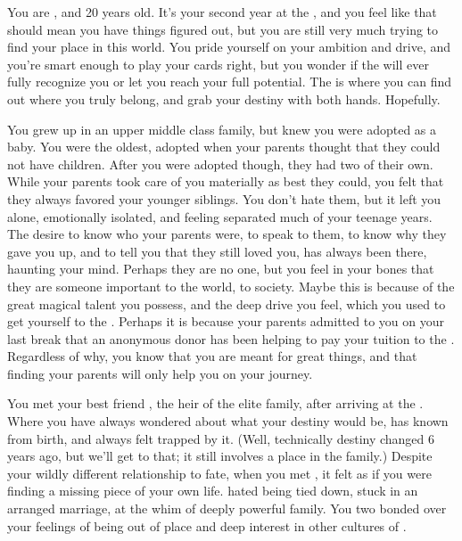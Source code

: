\documentclass[char]{GL2020}
\begin{document}
\name{\cAmbition{}}

You are \cAmbition{\intro}, and 20 years old. It's your second year at the \pSchool{}, and you feel like that should mean you have things figured out, but you are still very much trying to find your place in this world. You pride yourself on your ambition and drive, and you're smart enough to play your cards right, but you wonder if the \pTechies{} will ever fully recognize you or let you reach your full potential. The \pSchool{} is where you can find out where you truly belong, and grab your destiny with both hands. Hopefully. 

You grew up in an upper middle class family,  but knew you were adopted as a baby. You were the oldest, adopted when your parents thought that they could not have children. After you were adopted though, they had two of their own. While your parents took care of you materially as best they could, you felt that they always favored your younger siblings. You don’t hate them, but it left you alone, emotionally isolated, and feeling separated much of your teenage years. The desire to know who your parents were, to speak to them, to know why they gave you up,  and to tell you that they still loved you, has always been there, haunting your mind. Perhaps they are no one, but you feel in your bones that they are someone important to the world, to society. Maybe this is because of the great magical talent you possess, and the deep drive you feel, which you used to get yourself to the \pSchool{}. Perhaps it is because your parents admitted to you on your last break that an anonymous donor has been helping to pay your tuition to the \pSc{}. Regardless of why, you know that you are meant for great things, and that finding your parents will only help you on your journey. 

You met your best friend \cHeir{\intro}, the heir of the elite \cHeir{\formal} family, after arriving at the \pSc{}. Where you have always wondered about what your destiny would be, \cHeir{} has known from birth, and always felt trapped by it. (Well, technically \cHeir{\their} destiny changed 6 years ago, but we’ll get to that; it still involves a place in the \cHeir{\formal} family.) Despite your wildly different relationship to fate, when you met \cHeir{\them}, it felt as if you were finding a missing piece of your own life. \cHeir{\They} hated being tied down, stuck in an arranged marriage, at the whim of \cHeir{\their} deeply powerful family. You two bonded over your feelings of being out of place and deep interest in other cultures of \pEarth{}. 
\end{document}
